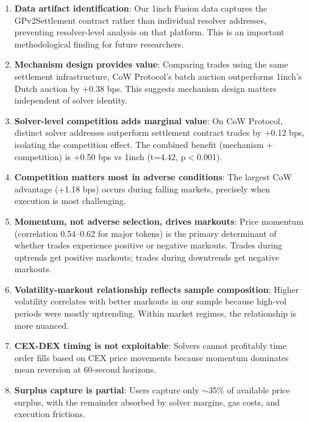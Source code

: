 \documentclass[12pt,a4paper]{article}
\begin{document}
\begin{enumerate}[leftmargin=*]
    \item \textbf{Data artifact identification}: Our 1inch Fusion data captures the GPv2Settlement contract rather than individual resolver addresses, preventing resolver-level analysis on that platform. This is an important methodological finding for future researchers.

    \item \textbf{Mechanism design provides value}: Comparing trades using the same settlement infrastructure, CoW Protocol's batch auction outperforms 1inch's Dutch auction by +0.38 bps. This suggests mechanism design matters independent of solver identity.

    \item \textbf{Solver-level competition adds marginal value}: On CoW Protocol, distinct solver addresses outperform settlement contract trades by +0.12 bps, isolating the competition effect. The combined benefit (mechanism + competition) is +0.50 bps vs 1inch (t=4.42, p$<$0.001).

    \item \textbf{Competition matters most in adverse conditions}: The largest CoW advantage (+1.18 bps) occurs during falling markets, precisely when execution is most challenging.

    \item \textbf{Momentum, not adverse selection, drives markouts}: Price momentum (correlation 0.54--0.62 for major tokens) is the primary determinant of whether trades experience positive or negative markouts. Trades during uptrends get positive markouts; trades during downtrends get negative markouts.

    \item \textbf{Volatility-markout relationship reflects sample composition}: Higher volatility correlates with better markouts in our sample because high-vol periods were mostly uptrending. Within market regimes, the relationship is more nuanced.

    \item \textbf{CEX-DEX timing is not exploitable}: Solvers cannot profitably time order fills based on CEX price movements because momentum dominates mean reversion at 60-second horizons.

    \item \textbf{Surplus capture is partial}: Users capture only $\sim$35\% of available price surplus, with the remainder absorbed by solver margins, gas costs, and execution frictions.


\end{enumerate}
\end{document}
